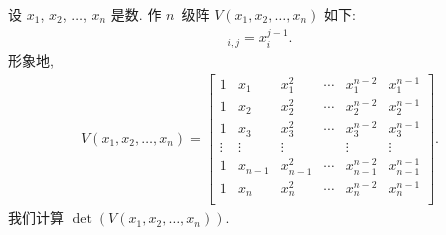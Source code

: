 \begin{example}
    设 \(x_1\), \(x_2\), \(\dots\), \(x_n\) 是数.
    作 \(n\)~级阵 \(V(x_1, x_2, \dots, x_n)\) 如下:
    \begin{align*}
        [V(x_1, x_2, \dots, x_n)]_{i,j}
        = x_i^{j-1}.
    \end{align*}
    形象地,
    \begin{align*}
        V(x_1, x_2, \dots, x_n)
        =
        \begin{bmatrix}
            1      & x_1     & x_1^2     & \cdots & x_1^{n-2}     & x_1^{n-1}     \\
            1      & x_2     & x_2^2     & \cdots & x_2^{n-2}     & x_2^{n-1}     \\
            1      & x_3     & x_3^2     & \cdots & x_3^{n-2}     & x_3^{n-1}     \\
            \vdots & \vdots  & \vdots    & {}     & \vdots        & \vdots        \\
            1      & x_{n-1} & x_{n-1}^2 & \cdots & x_{n-1}^{n-2} & x_{n-1}^{n-1} \\
            1      & x_n     & x_n^2     & \cdots & x_n^{n-2}     & x_n^{n-1}     \\
        \end{bmatrix}.
    \end{align*}
    我们计算 \(\det {(V(x_1, x_2, \dots, x_n))}\).


\end{example}

